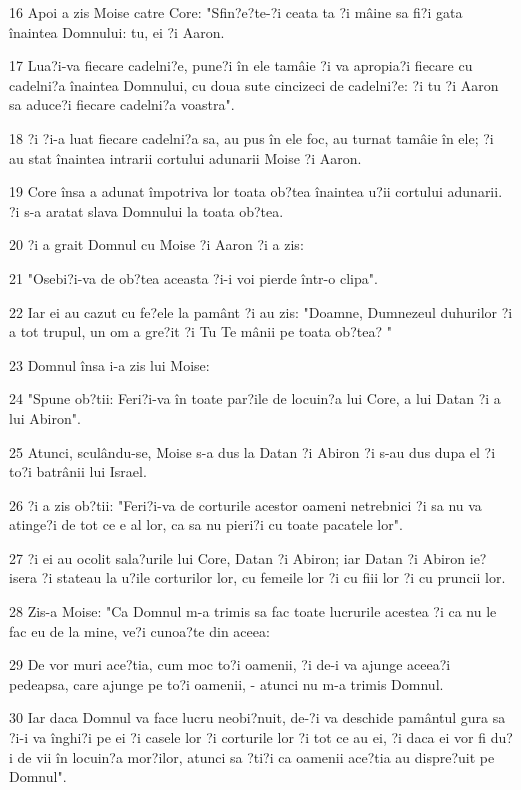 \par 16 Apoi a zis Moise catre Core: "Sfin?e?te-?i ceata ta ?i mâine sa fi?i gata înaintea Domnului: tu, ei ?i Aaron.
\par 17 Lua?i-va fiecare cadelni?e, pune?i în ele tamâie ?i va apropia?i fiecare cu cadelni?a înaintea Domnului, cu doua sute cincizeci de cadelni?e: ?i tu ?i Aaron sa aduce?i fiecare cadelni?a voastra".
\par 18 ?i ?i-a luat fiecare cadelni?a sa, au pus în ele foc, au turnat tamâie în ele; ?i au stat înaintea intrarii cortului adunarii Moise ?i Aaron.
\par 19 Core însa a adunat împotriva lor toata ob?tea înaintea u?ii cortului adunarii. ?i s-a aratat slava Domnului la toata ob?tea.
\par 20 ?i a grait Domnul cu Moise ?i Aaron ?i a zis:
\par 21 "Osebi?i-va de ob?tea aceasta ?i-i voi pierde într-o clipa".
\par 22 Iar ei au cazut cu fe?ele la pamânt ?i au zis: "Doamne, Dumnezeul duhurilor ?i a tot trupul, un om a gre?it ?i Tu Te mânii pe toata ob?tea? "
\par 23 Domnul însa i-a zis lui Moise:
\par 24 "Spune ob?tii: Feri?i-va în toate par?ile de locuin?a lui Core, a lui Datan ?i a lui Abiron".
\par 25 Atunci, sculându-se, Moise s-a dus la Datan ?i Abiron ?i s-au dus dupa el ?i to?i batrânii lui Israel.
\par 26 ?i a zis ob?tii: "Feri?i-va de corturile acestor oameni netrebnici ?i sa nu va atinge?i de tot ce e al lor, ca sa nu pieri?i cu toate pacatele lor".
\par 27 ?i ei au ocolit sala?urile lui Core, Datan ?i Abiron; iar Datan ?i Abiron ie?isera ?i stateau la u?ile corturilor lor, cu femeile lor ?i cu fiii lor ?i cu pruncii lor.
\par 28 Zis-a Moise: "Ca Domnul m-a trimis sa fac toate lucrurile acestea ?i ca nu le fac eu de la mine, ve?i cunoa?te din aceea:
\par 29 De vor muri ace?tia, cum moc to?i oamenii, ?i de-i va ajunge aceea?i pedeapsa, care ajunge pe to?i oamenii, - atunci nu m-a trimis Domnul.
\par 30 Iar daca Domnul va face lucru neobi?nuit, de-?i va deschide pamântul gura sa ?i-i va înghi?i pe ei ?i casele lor ?i corturile lor ?i tot ce au ei, ?i daca ei vor fi du?i de vii în locuin?a mor?ilor, atunci sa ?ti?i ca oamenii ace?tia au dispre?uit pe Domnul".
